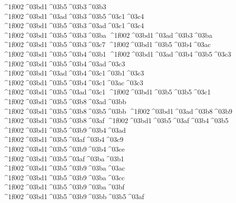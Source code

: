 {^^^^1f002^^^^03bd1^^^^03b5^^^^03b3^^^^03b3
^^^^1f002^^^^03bd1^^^^03ad^^^^03b3^^^^03b5^^^^03c1^^^^03c4 		%
^^^^1f002^^^^03bd1^^^^03b5^^^^03b3^^^^03ad^^^^03c1^^^^03c4
^^^^1f002^^^^03bd1^^^^03b5^^^^03b3^^^^03ba 		%
^^^^1f002^^^^03bd1^^^^03ad^^^^03b3^^^^03ba 		%
^^^^1f002^^^^03bd1^^^^03b5^^^^03b3^^^^03c7  		%
^^^^1f002^^^^03bd1^^^^03b5^^^^03b4^^^^03ac 		%
^^^^1f002^^^^03bd1^^^^03b5^^^^03b4^^^^03b1
^^^^1f002^^^^03bd1^^^^03ad^^^^03b4^^^^03b5^^^^03c3 		%
^^^^1f002^^^^03bd1^^^^03b5^^^^03b4^^^^03ad^^^^03c3
^^^^1f002^^^^03bd1^^^^03ad^^^^03b4^^^^03c1^^^^03b1^^^^03c3 		%
^^^^1f002^^^^03bd1^^^^03b5^^^^03b4^^^^03c1^^^^03ac^^^^03c3
^^^^1f002^^^^03bd1^^^^03b5^^^^03ad^^^^03c1 		%
^^^^1f002^^^^03bd1^^^^03b5^^^^03b5^^^^03c1
^^^^1f002^^^^03bd1^^^^03b5^^^^03b8^^^^03ad^^^^03bb  		%
^^^^1f002^^^^03bd1^^^^03b5^^^^03b8^^^^03b5^^^^03bb
^^^^1f002^^^^03bd1^^^^03ad^^^^03b8^^^^03b9 		%
^^^^1f002^^^^03bd1^^^^03b5^^^^03b8^^^^03af
^^^^1f002^^^^03bd1^^^^03b5^^^^03af^^^^03b4^^^^03b5 		%
^^^^1f002^^^^03bd1^^^^03b5^^^^03b9^^^^03b4^^^^03ad
^^^^1f002^^^^03bd1^^^^03b5^^^^03af^^^^03b4^^^^03c9 		%
^^^^1f002^^^^03bd1^^^^03b5^^^^03b9^^^^03b4^^^^03ce
^^^^1f002^^^^03bd1^^^^03b5^^^^03af^^^^03ba^^^^03b1 		%
^^^^1f002^^^^03bd1^^^^03b5^^^^03b9^^^^03ba^^^^03ac
^^^^1f002^^^^03bd1^^^^03b5^^^^03b9^^^^03ba^^^^03cc 		%
^^^^1f002^^^^03bd1^^^^03b5^^^^03b9^^^^03ba^^^^03bf
^^^^1f002^^^^03bd1^^^^03b5^^^^03b9^^^^03bb^^^^03b5^^^^03af 		%
}
